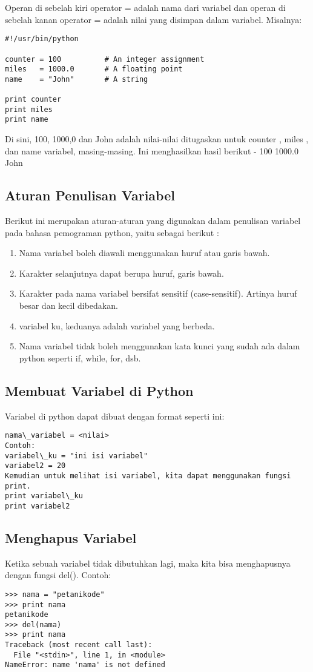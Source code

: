 Operan di sebelah kiri operator = adalah nama dari variabel dan operan di sebelah kanan operator = adalah nilai yang disimpan dalam variabel. Misalnya:

\begin{verbatim}
#!/usr/bin/python

counter = 100          # An integer assignment
miles   = 1000.0       # A floating point
name    = "John"       # A string

print counter
print miles
print name
\end{verbatim}

Di sini, 100, 1000,0 dan John adalah nilai-nilai ditugaskan untuk counter , miles , dan name variabel, masing-masing. Ini menghasilkan hasil berikut -
100
1000.0
John

\subsection{Aturan Penulisan Variabel}
Berikut ini merupakan aturan-aturan yang digunakan dalam penulisan variabel pada bahasa pemograman python, yaitu sebagai berikut :
\begin{enumerate}
	\item Nama variabel boleh diawali menggunakan huruf atau garis bawah.
	\item Karakter selanjutnya dapat berupa huruf, garis bawah.
	\item Karakter pada nama variabel bersifat sensitif (case-sensitif). Artinya huruf besar dan kecil dibedakan. 
	\item variabel ku, keduanya adalah variabel yang berbeda.
	\item Nama variabel tidak boleh menggunakan kata kunci yang sudah ada dalam python seperti if, while, for, dsb.
\end{enumerate}  

\subsection{Membuat Variabel di Python}
Variabel di python dapat dibuat dengan format seperti ini:

\begin{verbatim}
nama\_variabel = <nilai>
Contoh:
variabel\_ku = "ini isi variabel"
variabel2 = 20
Kemudian untuk melihat isi variabel, kita dapat menggunakan fungsi print.
print variabel\_ku
print variabel2
\end{verbatim}

\subsection{Menghapus Variabel}
Ketika sebuah variabel tidak dibutuhkan lagi, maka kita bisa menghapusnya dengan fungsi del().
Contoh:
\begin{verbatim}
>>> nama = "petanikode"
>>> print nama
petanikode
>>> del(nama)
>>> print nama
Traceback (most recent call last):
  File "<stdin>", line 1, in <module>
NameError: name 'nama' is not defined
\end{verbatim}

